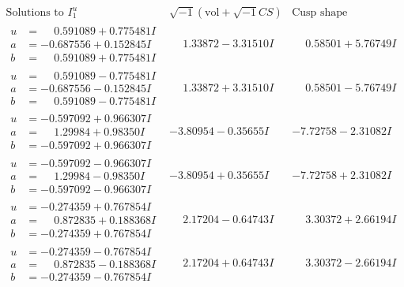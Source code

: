 \documentclass[1p]{elsarticle_modified}
\theoremstyle{definition}
\newcommand{\I}{\sqrt{-1}}
\begin{document}
$$\begin{array}{c|c|c}  
\text{Solutions to }I^u_{1}& \I (\text{vol} + \sqrt{-1}CS) & \text{Cusp shape}\\
 \hline 
\begin{aligned}
u &= \phantom{-}0.591089 + 0.775481 I \\
a &= -0.687556 + 0.152845 I \\
b &= \phantom{-}0.591089 + 0.775481 I\end{aligned}
 & \phantom{-}1.33872 - 3.31510 I & \phantom{-}0.58501 + 5.76749 I \\ \hline\begin{aligned}
u &= \phantom{-}0.591089 - 0.775481 I \\
a &= -0.687556 - 0.152845 I \\
b &= \phantom{-}0.591089 - 0.775481 I\end{aligned}
 & \phantom{-}1.33872 + 3.31510 I & \phantom{-}0.58501 - 5.76749 I \\ \hline\begin{aligned}
u &= -0.597092 + 0.966307 I \\
a &= \phantom{-}1.29984 + 0.98350 I \\
b &= -0.597092 + 0.966307 I\end{aligned}
 & -3.80954 - 0.35655 I & -7.72758 - 2.31082 I \\ \hline\begin{aligned}
u &= -0.597092 - 0.966307 I \\
a &= \phantom{-}1.29984 - 0.98350 I \\
b &= -0.597092 - 0.966307 I\end{aligned}
 & -3.80954 + 0.35655 I & -7.72758 + 2.31082 I \\ \hline\begin{aligned}
u &= -0.274359 + 0.767854 I \\
a &= \phantom{-}0.872835 + 0.188368 I \\
b &= -0.274359 + 0.767854 I\end{aligned}
 & \phantom{-}2.17204 - 0.64743 I & \phantom{-}3.30372 + 2.66194 I \\ \hline\begin{aligned}
u &= -0.274359 - 0.767854 I \\
a &= \phantom{-}0.872835 - 0.188368 I \\
b &= -0.274359 - 0.767854 I\end{aligned}
 & \phantom{-}2.17204 + 0.64743 I & \phantom{-}3.30372 - 2.66194 I \\ \hline\begin{aligned}

\end{aligned}
\end{array}$$
\end{document}
